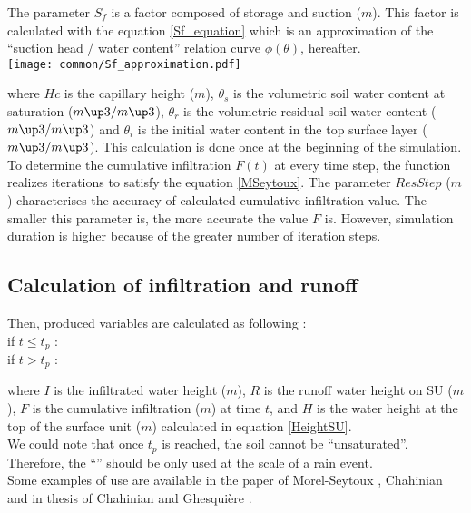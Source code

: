 The parameter $S_f$ is a factor composed of storage and suction ($m$). This factor is calculated with the equation \ref{Sf_equation} which is an approximation of the ``suction head / water content'' relation curve $\phi(\theta)$, hereafter.\\

\texttt{[image: common/Sf\_approximation.pdf]}


where $Hc$ is the capillary height ($m$), $\theta_s$  is the volumetric soil water content at saturation ($m\up3/m\up3$), $\theta_r$ is the volumetric residual soil water content ($m\up3 /m\up3$) and $\theta_i$ is the initial water content in the top surface layer ($m\up3 /m\up3$). This calculation is done once at the beginning of the simulation.\\

To determine the cumulative infiltration $F(t)$ at every time step, the function realizes iterations to satisfy the equation \ref{MSeytoux}. The parameter $ResStep$ ($m$) characterises the accuracy of calculated cumulative infiltration value. The smaller this parameter is, the more accurate the value $F$ is. However, simulation duration is higher because of the greater number of iteration steps.


\subsection{Calculation of infiltration and runoff}
Then, produced variables are calculated as following :\\

\hspace{-0.53cm} if $t \le t_p$ : \ \ \ \\
\vspace{-0.5mm}
if $t > t_p$ : \ \ \ 

where $I$ is the infiltrated water height ($m$), $R$ is the runoff water height on SU ($m$), $F$ is the cumulative infiltration ($m$) at time $t$, and $H$ is the water height at the top of the surface unit ($m$) calculated in equation \ref{HeightSU}.\\

We could note that once $t_p$ is reached, the soil cannot be ``unsaturated''. Therefore, the ``\englishname'' should be only used at the scale of a rain event.\\

Some examples of use are available in the paper of Morel-Seytoux \cite{MorelS1984}, Chahinian \cite{Chahinian2004b} and in thesis of Chahinian \cite{Chahinian2004} and Ghesquière \cite{Ghesquiere2008}.
